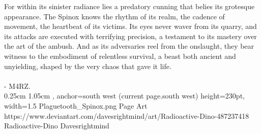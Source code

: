 For within its sinister radiance lies a predatory cunning that belies its grotesque appearance. The Spinox knows the rhythm of its realm, the cadence of movement, the heartbeat of its victims. Its eyes never waver from its quarry, and its attacks are executed with terrifying precision, a testament to its mastery over the art of the ambush. And as its adversaries reel from the onslaught, they bear witness to the embodiment of relentless survival, a beast both ancient and unyielding, shaped by the very chaos that gave it life.
\\\\- M4RZ.\\

%
{0.25cm}%
{1.05cm}%
{, anchor=south west}%
{(current page.south west)}%
{height=230pt, width=1.5\textwidth}%
{Plaguetooth_Spinox.png}%
	{Page \thepage}%
	{Art}%
	{https://www.deviantart.com/davesrightmind/art/Radioactive-Dino-487237418}%
	{Radioactive-Dino}%
	{Davesrightmind}%

